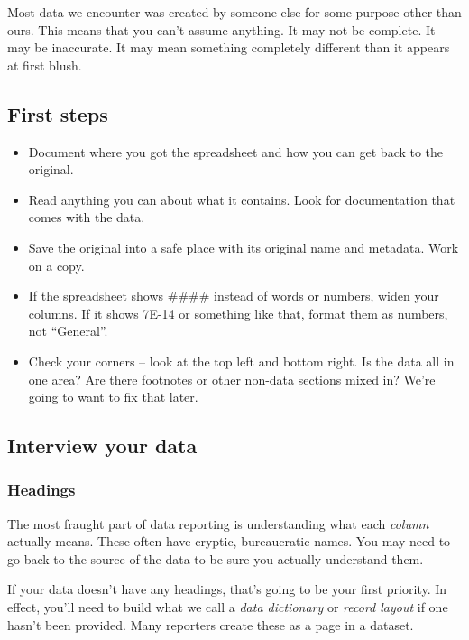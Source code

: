 \documentclass[
  letterpaper,
  DIV=11,
  numbers=noendperiod]{scrreprt}
\providecommand{\tightlist}{%
  \setlength{\itemsep}{0pt}\setlength{\parskip}{0pt}}\usepackage{longtable,booktabs,array}
\begin{document}
Most data we encounter was created by someone else for some purpose
other than ours. This means that you can't assume anything. It may not
be complete. It may be inaccurate. It may mean something completely
different than it appears at first blush.

\hypertarget{first-steps}{%
\subsection{First steps}\label{first-steps}}

\begin{itemize}
\tightlist
\item
  Document where you got the spreadsheet and how you can get back to the
  original.
\item
  Read anything you can about what it contains. Look for documentation
  that comes with the data.
\item
  Save the original into a safe place with its original name and
  metadata. Work on a copy.
\item
  If the spreadsheet shows \#\#\#\# instead of words or numbers, widen
  your columns. If it shows 7E-14 or something like that, format them as
  numbers, not ``General''.
\item
  Check your corners -- look at the top left and bottom right. Is the
  data all in one area? Are there footnotes or other non-data sections
  mixed in? We're going to want to fix that later.
\end{itemize}

\hypertarget{interview-your-data}{%
\subsection{Interview your data}\label{interview-your-data}}

\hypertarget{headings}{%
\subsubsection{Headings}\label{headings}}

The most fraught part of data reporting is understanding what each
\emph{column} actually means. These often have cryptic, bureaucratic
names. You may need to go back to the source of the data to be sure you
actually understand them.

If your data doesn't have any headings, that's going to be your first
priority. In effect, you'll need to build what we call a \emph{data
dictionary} or \emph{record layout} if one hasn't been provided. Many
reporters create these as a page in a dataset.
\end{document}
